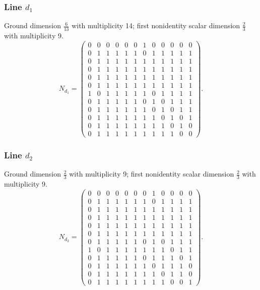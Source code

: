 \subsubsection*{Line $d_{1}$}
\noindent Ground dimension $\frac{6}{13}$ with multiplicity 14; first nonidentity scalar dimension $\frac{2}{3}$ with multiplicity 9.
\[\renewcommand{\arraystretch}{0.93}N_{d_{1}}=\left(\begin{array}{rrrrrrrrrrrr}
0&0&0&0&0&0&1&0&0&0&0&0\\
0&1&1&1&1&1&0&1&1&1&1&1\\
0&1&1&1&1&1&1&1&1&1&1&1\\
0&1&1&1&1&1&1&1&1&1&1&1\\
0&1&1&1&1&1&1&1&1&1&1&1\\
0&1&1&1&1&1&1&1&1&1&1&1\\
1&0&1&1&1&1&1&0&1&1&1&1\\
0&1&1&1&1&1&0&1&0&1&1&1\\
0&1&1&1&1&1&1&0&1&0&1&1\\
0&1&1&1&1&1&1&1&0&1&0&1\\
0&1&1&1&1&1&1&1&1&0&1&0\\
0&1&1&1&1&1&1&1&1&1&0&0
\end{array}\right).\]
\subsubsection*{Line $d_{2}$}
\noindent Ground dimension $\frac{2}{3}$ with multiplicity 9; first nonidentity scalar dimension $\frac{2}{3}$ with multiplicity 9.
\[\renewcommand{\arraystretch}{0.93}N_{d_{2}}=\left(\begin{array}{rrrrrrrrrrrr}
0&0&0&0&0&0&0&1&0&0&0&0\\
0&1&1&1&1&1&1&0&1&1&1&1\\
0&1&1&1&1&1&1&1&1&1&1&1\\
0&1&1&1&1&1&1&1&1&1&1&1\\
0&1&1&1&1&1&1&1&1&1&1&1\\
0&1&1&1&1&1&1&1&1&1&1&1\\
0&1&1&1&1&1&0&1&0&1&1&1\\
1&0&1&1&1&1&1&1&1&0&1&1\\
0&1&1&1&1&1&0&1&1&1&0&1\\
0&1&1&1&1&1&1&0&1&1&1&0\\
0&1&1&1&1&1&1&1&0&1&1&0\\
0&1&1&1&1&1&1&1&1&0&0&1
\end{array}\right).\]
